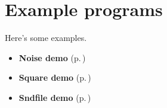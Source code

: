 \section{Example programs}
\label{group__flamflim}
Here's some examples.\begin{itemize}
\item {\bf Noise demo }{\rm (p.\,\pageref{group__noisedemo})}\item {\bf Square demo }{\rm (p.\,\pageref{group__squaredemo})}\item {\bf Sndfile demo }{\rm (p.\,\pageref{group__sndfiledemo})} \end{itemize}


